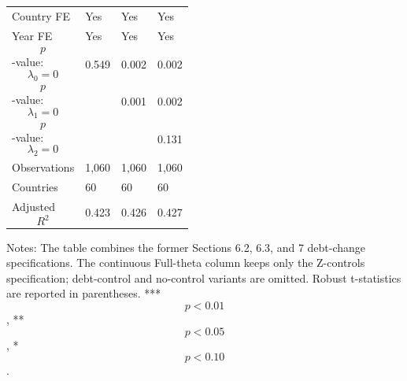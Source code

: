 \begin{table}[H]
\begin{threeparttable}
\begin{tabularx}{\textwidth}{lYYY}
Country FE & Yes & Yes & Yes \\
Year FE & Yes & Yes & Yes \\
$$p$$-value: $$\lambda_0=0$$ & 0.549 & 0.002 & 0.002 \\
$$p$$-value: $$\lambda_1=0$$ &  & 0.001 & 0.002 \\
$$p$$-value: $$\lambda_2=0$$ &  &  & 0.131 \\
Observations & 1,060 & 1,060 & 1,060 \\
Countries & 60 & 60 & 60 \\
Adjusted $$R^2$$ & 0.423 & 0.426 & 0.427 \\
\bottomrule
\end{tabularx}
\begin{tablenotes}[flushleft]\footnotesize
\item Notes: The table combines the former Sections 6.2, 6.3, and 7 debt-change specifications. The continuous Full-theta column keeps only the Z-controls specification; debt-control and no-control variants are omitted. Robust t-statistics are reported in parentheses. *** $$p<0.01$$, ** $$p<0.05$$, * $$p<0.10$$.
\end{tablenotes}
\end{threeparttable}
\end{table}
